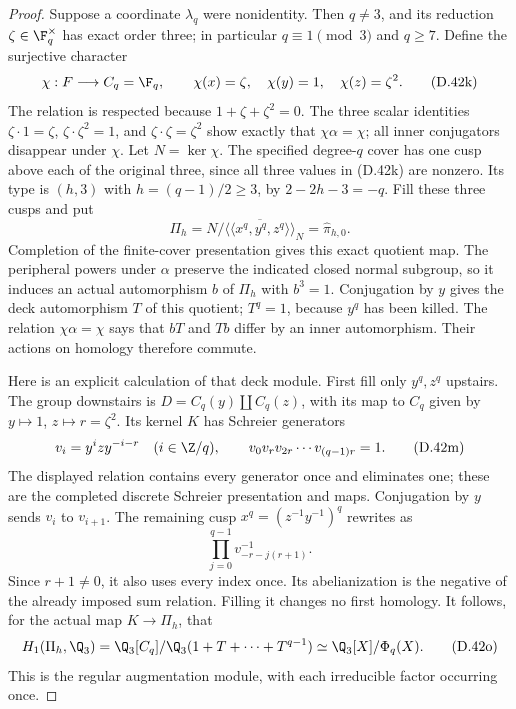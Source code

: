 \begin{proof}
Suppose a coordinate $\lambda_q$ were nonidentity.
Then $q\ne3$, and its reduction
$\zeta\in\F_q^\times$ has exact order three;
in particular $q\equiv1\pmod3$ and $q\geq7$.
Define the surjective character
\[
 \chi:F\longrightarrow C_q=\F_q,\qquad
 \chi(x)=\zeta,\quad\chi(y)=1,\quad\chi(z)=\zeta^2.
                                                        \tag{D.42k}
\]
The relation is respected because
$1+\zeta+\zeta^2=0$.
The three scalar identities
$\zeta\cdot1=\zeta$,
$\zeta\cdot\zeta^2=1$, and
$\zeta\cdot\zeta=\zeta^2$
show exactly that $\chi\alpha=\chi$;
all inner conjugators disappear under $\chi$.
Let $N=\ker\chi$.
The specified degree-$q$ cover has one cusp
above each of the original three, since all
three values in (D.42k) are nonzero.
Its type is $(h,3)$ with
$h=(q-1)/2\geq3$, by
$2-2h-3=-q$.
Fill these three cusps and put
\[
 \Pi_h=N/\overline{\langle\!\langle x^q,y^q,z^q
                         \rangle\!\rangle}_N
          =\widehat\pi_{h,0}.                            \tag{D.42l}
\]
Completion of the finite-cover presentation
gives this exact quotient map.
The peripheral powers under $\alpha$ preserve
the indicated closed normal subgroup, so it
induces an actual automorphism $b$ of $\Pi_h$
with $b^3=1$.
Conjugation by $y$ gives the deck automorphism
$T$ of this quotient; $T^q=1$, because $y^q$
has been killed.
The relation $\chi\alpha=\chi$ says that
$bT$ and $Tb$ differ by an inner automorphism.
Their actions on homology therefore commute.

Here is an explicit calculation of that deck
module.  First fill only $y^q,z^q$ upstairs.
The group downstairs is
$D=C_q(y)\amalg C_q(z)$, with its map to
$C_q$ given by $y\mapsto1$, $z\mapsto r=\zeta^2$.
Its kernel $K$ has Schreier generators
\[
 v_i=y^iz y^{-i-r}\quad(i\in\Z/q),\qquad
           v_0v_rv_{2r}\cdots v_{(q-1)r}=1.              \tag{D.42m}
\]
The displayed relation contains every generator
once and eliminates one; these are the completed
discrete Schreier presentation and maps.
Conjugation by $y$ sends $v_i$ to $v_{i+1}$.
The remaining cusp $x^q=(z^{-1}y^{-1})^q$
rewrites as
\[
             \prod_{j=0}^{q-1}
                    v_{-r-j(r+1)}^{-1}.                \tag{D.42n}
\]
Since $r+1\ne0$, it also uses every index once.
Its abelianization is the negative of the
already imposed sum relation.  Filling it changes
no first homology.  It follows, for the actual
map $K\to\Pi_h$, that
\[
 H_1(\Pi_h,\Q_3)
   =\Q_3[C_q]/\Q_3(1+T+\cdots+T^{q-1})
   \simeq\Q_3[X]/\Phi_q(X).                             \tag{D.42o}
\]
This is the regular augmentation module, with
each irreducible factor occurring once.


\end{proof}
